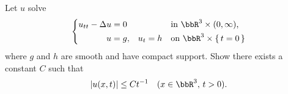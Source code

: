 \begin{problem}
  Let \(u\) solve
  \[
    \left\{
      \begin{aligned}
        u_{tt}-\Delta u=0\phantom{,}&&&&&\text{in \(\bbR^3\times(0,\infty)\),}\\
        u=g,&&u_t=h&&&\text{on \(\bbR^3\times\{\,t=0\,\}\)}
      \end{aligned}
    \right.
  \]
  where \(g\) and \(h\) are smooth and have compact support. Show there
  exists a constant \(C\) such that
  \[
    |u(x,t)|\leq Ct^{-1}\quad(x\in\bbR^3,\,t>0).
  \]
\end{problem}
\begin{solution}
\end{solution}

